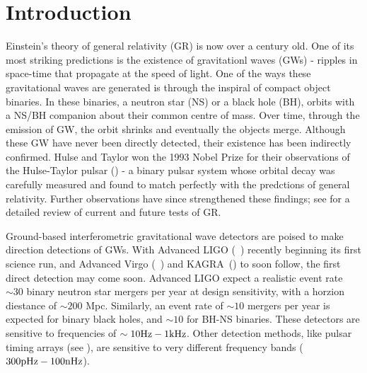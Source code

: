 \section{Introduction}

Einstein's theory of general relativity (GR) is now over a century old. One of its most striking predictions is the existence of gravitationl waves (GWs) - ripples in space-time that propagate at the speed of light. One of the ways these gravitational waves are generated is through the inspiral of compact object binaries. In these binaries, a neutron star (NS) or a black hole (BH), orbits with a NS/BH companion about their common centre of mass. Over time, through the emission of GW, the orbit shrinks and eventually the objects merge. Although these GW have never been directly detected, their existence has been indirectly confirmed. Hulse and Taylor won the 1993 Nobel Prize for their observations of the Hulse-Taylor pulsar (\cite{Hulse:1974eb}) - a binary pulsar system whose orbital decay was carefully measured and found to match perfectly with the predctions of general relativity. Further observations have since strengthened these findings; see \cite{Berti:2015itd} for a detailed review of current and future tests of GR. 

Ground-based interferometric gravitational wave detectors are poised to make direction detections of GWs. With Advanced LIGO (~\cite{aLIGO1,aLIGO2}) recently beginning its first science run, and Advanced Virgo (~\cite{AdV,TheVirgo:2014hva}) and KAGRA~(\cite{Somiya:2012}) to soon follow, the first direct detection may come soon. Advanced LIGO expect a realistic event rate $\sim 30$ binary neutron star mergers per year at design sensitivity, with a horzion diestance of $\sim 200$ Mpc. Similarly, an event rate of $\sim 10$ mergers per year is expected for binary black holes, and $\sim 10$ for BH-NS binaries. These detectors are sensitive to frequencies of $\sim 10{\rm Hz} - 1{\rm kHz}$. Other detection methods, like pulsar timing arrays (see \cite{Joshi:2013at}), are sensitive to very different frequency bands ($300{\rm pHz}-100{\rm nHz}$).

